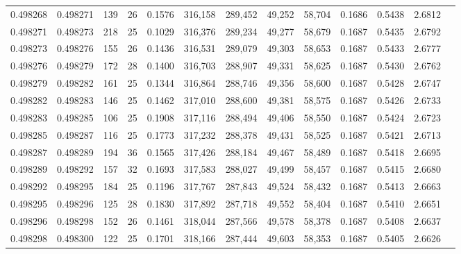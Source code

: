\begin{tabular}{rrrrrrrrrrrrr}
0.498268 & 0.498271 & 139 &  26 &                                     0.1576 & 316,158 & 289,452 &  49,252 &  58,704 & 0.1686 & 0.5438 & 2.6812 \\
0.498271 & 0.498273 & 218 &  25 &                                     0.1029 & 316,376 & 289,234 &  49,277 &  58,679 & 0.1687 & 0.5435 & 2.6792 \\
0.498273 & 0.498276 & 155 &  26 &                                     0.1436 & 316,531 & 289,079 &  49,303 &  58,653 & 0.1687 & 0.5433 & 2.6777 \\
0.498276 & 0.498279 & 172 &  28 &                                     0.1400 & 316,703 & 288,907 &  49,331 &  58,625 & 0.1687 & 0.5430 & 2.6762 \\
0.498279 & 0.498282 & 161 &  25 &                                     0.1344 & 316,864 & 288,746 &  49,356 &  58,600 & 0.1687 & 0.5428 & 2.6747 \\
0.498282 & 0.498283 & 146 &  25 &                                     0.1462 & 317,010 & 288,600 &  49,381 &  58,575 & 0.1687 & 0.5426 & 2.6733 \\
0.498283 & 0.498285 & 106 &  25 &                                     0.1908 & 317,116 & 288,494 &  49,406 &  58,550 & 0.1687 & 0.5424 & 2.6723 \\
0.498285 & 0.498287 & 116 &  25 &                                     0.1773 & 317,232 & 288,378 &  49,431 &  58,525 & 0.1687 & 0.5421 & 2.6713 \\
0.498287 & 0.498289 & 194 &  36 &                                     0.1565 & 317,426 & 288,184 &  49,467 &  58,489 & 0.1687 & 0.5418 & 2.6695 \\
0.498289 & 0.498292 & 157 &  32 &                                     0.1693 & 317,583 & 288,027 &  49,499 &  58,457 & 0.1687 & 0.5415 & 2.6680 \\
0.498292 & 0.498295 & 184 &  25 &                                     0.1196 & 317,767 & 287,843 &  49,524 &  58,432 & 0.1687 & 0.5413 & 2.6663 \\
0.498295 & 0.498296 & 125 &  28 &                                     0.1830 & 317,892 & 287,718 &  49,552 &  58,404 & 0.1687 & 0.5410 & 2.6651 \\
0.498296 & 0.498298 & 152 &  26 &                                     0.1461 & 318,044 & 287,566 &  49,578 &  58,378 & 0.1687 & 0.5408 & 2.6637 \\
0.498298 & 0.498300 & 122 &  25 &                                     0.1701 & 318,166 & 287,444 &  49,603 &  58,353 & 0.1687 & 0.5405 & 2.6626 \\

\end{tabular}

